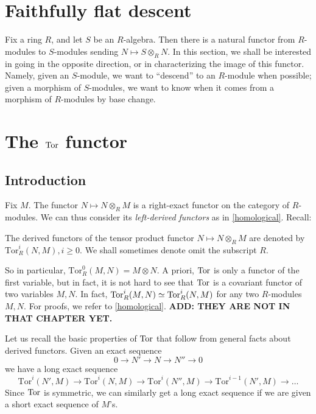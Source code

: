 \section{Faithfully flat descent}

Fix a ring $R$, and let $S$ be an $R$-algebra. Then there is a natural functor
from $R$-modules to $S$-modules sending $N \mapsto S \otimes_R N$.
In this section, we shall be interested in going in the opposite direction,
or in characterizing the image of this functor.
Namely, given an $S$-module, we want to ``descend'' to an $R$-module when
possible; given a morphism of $S$-modules, we want to know when it comes from a
morphism of $R$-modules by base change.

\section{The $\operatorname{Tor}$ functor}
 

\subsection{Introduction}
Fix $M$. The functor $N \mapsto N \otimes_R M$ is a right-exact functor on the
category of $R$-modules. We can thus consider its \emph{left-derived functors}
as in \cref{homological}. 
Recall:

\begin{definition} 
The derived functors of the tensor product functor $N \mapsto N \otimes_R M$ are denoted by
$\mathrm{Tor} _R^i( N, M), i \geq 0$.  We shall sometimes denote omit the
subscript $R$.
\end{definition} 

So in particular, $\mathrm{Tor} _R^0(M,N) = M \otimes N$.  
A priori, $\operatorname{Tor}$ is only a functor of the first variable, but in fact, it is
not hard to see that $\operatorname{Tor}$ is a covariant functor of two variables $M, N$. 
In fact, $\operatorname{Tor}_R^i(M, N) \simeq \operatorname{Tor}_R^i(N, M)$ for any two $R$-modules $M, N$.
For proofs, we refer to \cref{homological}. \textbf{ADD: THEY ARE NOT IN THAT
CHAPTER YET.}

Let us recall the basic properties of $\operatorname{Tor}$ that follow from general facts
about derived functors. Given an exact sequence
\[ 0 \to N' \to N \to N'' \to 0 \]
we have a long exact sequence
\[ \mathrm{Tor} ^i(N',M) \to \mathrm{Tor} ^i(N,M) \to \mathrm{Tor} ^i(N'',M ) \to \mathrm{Tor} ^{i-1}(N',M) \to \dots \]
Since $\operatorname{Tor}$ is symmetric, we can similarly get a long exact sequence if we
are given a short exact sequence of $M$'s.

